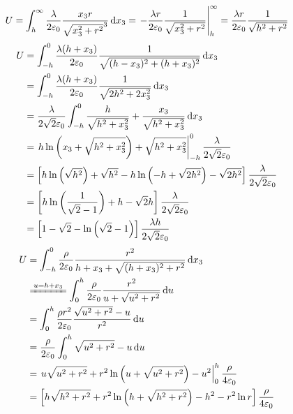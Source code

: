 \begin{align*}
    U=\int_{h}^{\infty}\frac{\lambda}{2\varepsilon_0}\frac{x_3r}{\sqrt{x_3^2+r^2}^3}\dif x_3
    =\left.-\frac{\lambda r}{2\varepsilon_0}\frac{1}{\sqrt{x_3^2+r^2}}\right|_{h}^{\infty}
    =\frac{\lambda r}{2\varepsilon_0}\frac{1}{\sqrt{h^2+r^2}}
\end{align*}
\begin{align*}
    U&=\int_{-h}^{0}\frac{\lambda (h+x_3)}{2\varepsilon_0}\frac{1}{\sqrt{(h-x_3)^2+(h+x_3)^2}}\dif x_3\\
    &=\int_{-h}^{0}\frac{\lambda (h+x_3)}{2\varepsilon_0}\frac{1}{\sqrt{2h^2+2x_3^2}}\dif x_3\\
    &=\frac{\lambda }{2\sqrt{2}\varepsilon_0}\int_{-h}^{0}\frac{h}{\sqrt{h^2+x_3^2}}+\frac{x_3}{\sqrt{h^2+x_3^2}}\dif x_3\\
    &=\left.h\ln\left({x_3}+{\sqrt{h^2+x_3^2}}\right)+\sqrt{h^2+x_3^2}\right|_{-h}^{0}\frac{\lambda }{2\sqrt{2}\varepsilon_0}\\
    &=\left[h\ln\left({\sqrt{h^2}}\right)
    +\sqrt{h^2}
    -h\ln\left({-h}+{\sqrt{2h^2}}\right)
    -\sqrt{2h^2}\right]\frac{\lambda }{2\sqrt{2}\varepsilon_0}\\
    &=\left[h\ln\left(\frac{1}{\sqrt{2}-1}\right)
    +h
    -\sqrt{2}h\right]\frac{\lambda }{2\sqrt{2}\varepsilon_0}\\
    &=\left[1
    -\sqrt{2}
    -\ln\left({\sqrt{2}-1}\right)\right]\frac{\lambda h}{2\sqrt{2}\varepsilon_0}
\end{align*}
\begin{align*}
    U&=\int_{-h}^{0}\frac{\rho}{2\varepsilon_0}\frac{r^2}{h+x_3+\sqrt{(h+x_3)^2+r^2}}\dif x_3\\
    &\xlongequal{u=h+x_3}\int_{0}^{h}\frac{\rho}{2\varepsilon_0}\frac{r^2}{u+\sqrt{u^2+r^2}}\dif u\\
    &=\int_{0}^{h}\frac{\rho r^2}{2\varepsilon_0}\frac{\sqrt{u^2+r^2}-u}{r^2}\dif u\\
    &=\frac{\rho}{2\varepsilon_0}\int_{0}^{h}{\sqrt{u^2+r^2}-u}\dif u\\
    &=\left.{u\sqrt{u^2+r^2}
    +r^2\ln\left(u+\sqrt{u^2+r^2}\right)
    -u^2}\right|_{0}^{h}\frac{\rho}{4\varepsilon_0}\\
    &=\left[{h\sqrt{h^2+r^2}
    +r^2\ln\left(h+\sqrt{h^2+r^2}\right)
    -h^2}
    -r^2\ln {r}\right]\frac{\rho}{4\varepsilon_0}
\end{align*}
